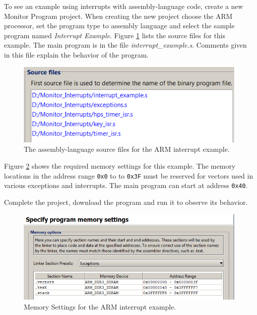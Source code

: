 \documentclass[11pt, twoside, pdftex]{article}
\begin{document}
To see an example using interrupts with assembly-language code, 
create a new Monitor Program project.
When creating the new project choose the ARM processor,
set the program type to assembly language and select the sample
program named {\it Interrupt Example}. 
Figure \ref{fig:NPW_interrupts_sourcefiles_arm} lists the source files for this example.
The main program is in the file {\it interrupt\_example.s}.
Comments given in this file explain the behavior of the program.

\begin{figure}[H]
   \begin{center}
      \includegraphics[scale=1]{screenshots/figure56.png}
   \end{center}
   \caption{The assembly-language source files for the ARM interrupt example.} 
   \label{fig:NPW_interrupts_sourcefiles_arm}   
\end{figure}

 
Figure \ref{fig:NPW_interrupts_memorysettings_arm} shows the required memory settings for this example.
The memory locations in the address range \texttt{0x0} to
to \texttt{0x3F} must be reserved for vectors used in various
exceptions and interrupts. The main program can start at
address \texttt{0x40}.

Complete the project, download the program and run it to observe
its behavior.   


\begin{figure}[H]
   \begin{center}
      \includegraphics[scale=0.6]{screenshots/figure57.png}
   \end{center}
   \caption{Memory Settings for the ARM interrupt example.} 
   \label{fig:NPW_interrupts_memorysettings_arm}
\end{figure}
\end{document}
